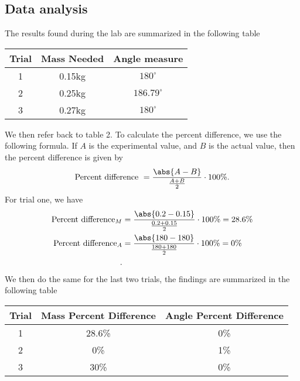 \documentclass{report}
\begin{document}
    \subsection{Data analysis}
    \bigbreak \noindent 
    The results found during the lab are summarized in the following table
    \bigbreak \noindent 
    \begin{center}
        \begin{tabular}{c|c|c}
            Trial & Mass Needed & Angle measure \\
            \hline 
            1 & 0.15kg & $180^{\circ}$\\
            2 & 0.25kg & $186.79^{\circ}$\\
            3 & 0.27kg & $180^{\circ}$\\
        \end{tabular}
    \end{center}
    \bigbreak \noindent 
    We then refer back to table 2. To calculate the percent difference, we use the following formula. If $A$ is the experimental value, and $B$ is the actual value, then the percent difference is given by
    \begin{align*}
        \text{Percent difference } = \frac{\abs{A - B}}{\frac{A+B}{2}} \cdot 100\%
    .\end{align*}
    \bigbreak \noindent 
    For trial one, we have 
    \begin{align*}
        \text{Percent difference}_{M} &= \frac{\abs{0.2 - 0.15}}{\frac{0.2 + 0.15}{2}}  \cdot 100\% = 28.6\%\\
        \text{Percent difference}_{A} &= \frac{\abs{180-180}}{\frac{180+180}{2}} \cdot 100\% = 0\% \\
    .\end{align*}
    \bigbreak \noindent 
    We then do the same for the last two trials, the findings are summarized in the following table
    \bigbreak \noindent 
    \begin{center}
        \begin{tabular}{c|c|c}
            Trial & Mass Percent Difference & Angle Percent Difference \\
            \hline 
            1 & 28.6\% & 0\%\\
            2 & 0\% & 1\%\\
            3 & 30\% & 0\%
        \end{tabular}
    \end{center}
\end{document}
